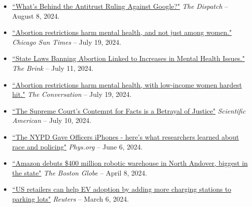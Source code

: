 \documentclass[10.5pt,letterpaper,sans]{moderncv}        %
\begin{document}
\begin{itemize}
\item \textcolor{gray}{\href{https://thedispatch.com/newsletter/techne/antitrust-ruling-google/}{``What's Behind the Antitrust Ruling Against Google?"}} \textit{The Dispatch} -- August 8, 2024.

\item \textcolor{gray}{\href{https://chicago.suntimes.com/other-views/2024/07/19/abortion-restrictions-harm-mental-health-gender-race-income-brad-greenwood-the-conversation}{``Abortion restrictions harm mental health, and not just among women."}} \textit{Chicago Sun Times} -- July 19, 2024.

\item \textcolor{gray}{\href{https://www.bu.edu/articles/2024/state-laws-banning-abortion-linked-to-increases-in-mental-health-issues/}{``State Laws Banning Abortion Linked to Increases in Mental Health Issues."}} \textit{The Brink} -- July 11, 2024.

\item \textcolor{gray}{\href{https://theconversation.com/abortion-restrictions-harm-mental-health-with-low-income-women-hardest-hit-233954}{``Abortion restrictions harm mental health, with low-income women hardest hit."}} \textit{The Conversation} -- July 19, 2024.

\item \textcolor{gray}{\href{https://www.scientificamerican.com/article/the-supreme-courts-contempt-for-facts-is-a-betrayal-of-justice/}{``The Supreme Court's Contempt for Facts is a Betrayal of Justice"}} \textit{Scientific American} -- July 10, 2024.

\item \textcolor{gray}{\href{https://phys.org/news/2024-06-nypd-gave-officers-iphones-policing.html}{``The NYPD Gave Officers iPhones - here's what researchers learned about race and policing"}} \textit{Phys.org} -- June 6, 2024.

\item \textcolor{gray}{\href{https://www.bostonglobe.com/2024/04/08/business/amazon-robotics-warehouse-north-andover/}{``Amazon debuts \$400 million robotic warehouse in North Andover, biggest in the state"}} \textit{The Boston Globe} -- April 8, 2024.

\item \textcolor{gray}{\href{https://www.reuters.com/business/autos-transportation/retailers-could-help-boost-ev-charging-us-report-says-2024-03-06/}{``US retailers can help EV adoption by adding more charging stations to parking lots"}} \textit{Reuters} -- March 6, 2024.


\end{itemize}
\end{document}
